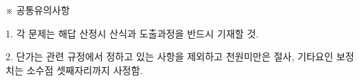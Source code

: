 \begin{framedtext}
※ 공통유의사항 \par
1. 각 문제는 해답 산정시 산식과 도출과정을 반드시 기재할 것. \par
2. 단가는 관련 규정에서 정하고 있는 사항을 제외하고 천원미만은 절사, 기타요인 보정치는 소수점 셋째자리까지 사정함. \par
\end{framedtext}
